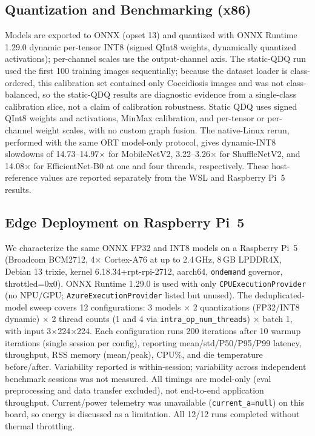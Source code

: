 \documentclass[conference,a4paper]{IEEEtran}
\begin{document}
\subsection{Quantization and Benchmarking (x86)}
Models are exported to ONNX (opset 13) and quantized with ONNX Runtime 1.29.0 dynamic per-tensor INT8 (signed QInt8 weights, dynamically quantized activations); per-channel scales use the output-channel axis. The static-QDQ run used the first 100 training images sequentially; because the dataset loader is class-ordered, this calibration set contained only Coccidiosis images and was not class-balanced, so the static-QDQ results are diagnostic evidence from a single-class calibration slice, not a claim of calibration robustness. Static QDQ uses signed QInt8 weights and activations, MinMax calibration, and per-tensor or per-channel weight scales, with no custom graph fusion. The native-Linux rerun, performed with the same ORT model-only protocol, gives dynamic-INT8 slowdowns of 14.73--14.97$\times$ for MobileNetV2, 3.22--3.26$\times$ for ShuffleNetV2, and 14.08$\times$ for EfficientNet-B0 at one and four threads, respectively. These host-reference values are reported separately from the WSL and Raspberry Pi~5 results.

\subsection{Edge Deployment on Raspberry Pi~5}
We characterize the same ONNX FP32 and INT8 models on a Raspberry Pi~5 (Broadcom BCM2712, 4$\times$ Cortex-A76 at up to 2.4\,GHz, 8\,GB LPDDR4X, Debian 13 trixie, kernel 6.18.34+rpt-rpi-2712, aarch64, \texttt{ondemand} governor, throttled=0x0). ONNX Runtime 1.29.0 is used with only \texttt{CPUExecutionProvider} (no NPU/GPU; \texttt{AzureExecutionProvider} listed but unused). The deduplicated-model sweep  covers 12 configurations: 3 models $\times$ 2 quantizations (FP32/INT8 dynamic) $\times$ 2 thread counts (1 and 4 via \texttt{intra\_op\_num\_threads}) $\times$ batch 1, with input 3$\times$224$\times$224. Each configuration runs 200 iterations after 10 warmup iterations (single session per config), reporting mean/std/P50/P95/P99 latency, throughput, RSS memory (mean/peak), CPU\%, and die temperature before/after. Variability reported is within-session; variability across independent benchmark sessions was not measured. All timings are model-only (eval preprocessing and data transfer excluded), not end-to-end application throughput. Current/power telemetry was unavailable (\texttt{current\_a=null}) on this board, so energy is discussed as a limitation. All 12/12 runs completed without thermal throttling.
\end{document}
